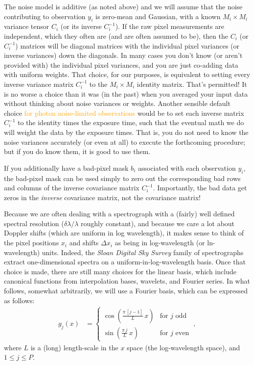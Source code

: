 \documentclass[modern, linenumbers]{aastex631}
\newcommand{\modified}[1]{\textcolor{orange}{#1}}
\begin{document}
The noise model is additive (as noted above) and we will assume that the noise contributing to observation $y_i$ is zero-mean and Gaussian, with a known $M_i\times M_i$ variance tensor $C_i$ (or its inverse $C_i^{-1}$).
If the raw pixel measurements are independent, which they often are (and are often assumed to be), then the $C_i$ (or $C_i^{-1}$) matrices will be diagonal matrices with the individual pixel variances (or inverse variances) down the diagonals.
In many cases you don't know (or aren't provided with) the individual pixel variances, and you are just co-adding data with uniform weights.
That choice, for our purposes, is equivalent to setting every inverse variance matrix $C_i^{-1}$ to the $M_i\times M_i$ identity matrix.
That's permitted!
It is no worse a choice than it was (in the past) when you averaged your input data without thinking about noise variances or weights.
Another sensible default choice \modified{for photon noise-limited observations} would be to set each inverse matrix $C_i^{-1}$ to the identity times the exposure time, such that the eventual math we do will weight the data by the exposure times.
That is, you do not need to know the noise variances accurately (or even at all) to execute the forthcoming procedure; but if you do know them, it is good to use them.

If you additionally have a bad-pixel mask $b_i$ associated with each observation $y_i$, the bad-pixel mask can be used simply to zero out the corresponding bad rows and columns of the inverse covariance matrix $C_i^{-1}$.
Importantly, the bad data get zeros in the \emph{inverse} covariance matrix, not the covariance matrix!

Because we are often dealing with a spectrograph with a (fairly) well defined spectral resolution ($\delta\lambda/\lambda$ roughly constant), and because we care a lot about Doppler shifts (which are uniform in log wavelength), it makes sense to think of the pixel positions $x_i$ and shifts $\Delta x_i$ as being in log-wavelength (or ln-wavelength) units.
Indeed, the \textsl{Sloan Digital Sky Survey} family of spectrographs extract one-dimensional spectra on a uniform-in-log-wavelength basis.
Once that choice is made, there are still many choices for the linear basis,
which include canonical functions from interpolation bases, wavelets, and Fourier series.
In what follows, somewhat arbitrarily, we will use a Fourier basis, which can be expressed as follows:
\begin{align}
    g_j(x) & = \left\{\begin{array}{cl}\displaystyle\cos\left(\frac{\pi\,[j-1]}{L}\,x\right) & \mbox{for $j$ odd} \\[3ex]
    \displaystyle\sin\left(\frac{\pi\,j}{L}\,x\right) & \mbox{for $j$ even}\end{array}\right. ~,\label{eq:basis}
\end{align}
where $L$ is a (long) length-scale in the $x$ space (the log-wavelength space), and $1\leq j\leq P$.
\end{document}
